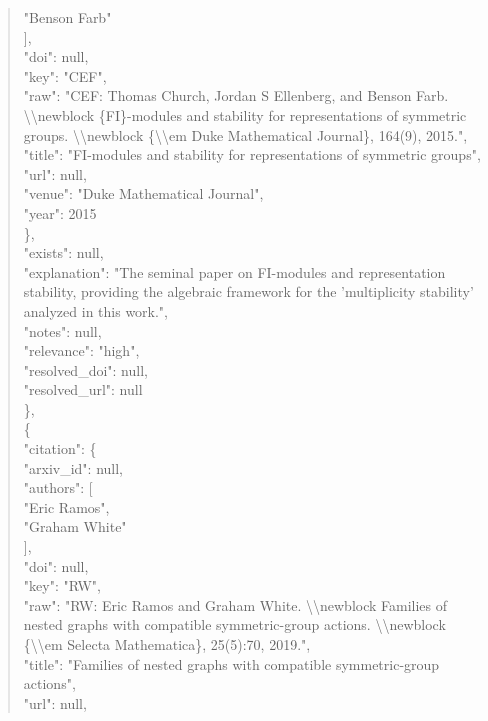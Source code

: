 \documentclass[11pt]{article}
\begin{document}
\begin{quote}
          "Benson Farb"\\
        ],\\
        "doi": null,\\
        "key": "CEF",\\
        "raw": "CEF: Thomas Church, Jordan S Ellenberg, and Benson Farb. \textbackslash{}\textbackslash{}newblock \{FI\}-modules and stability for representations of symmetric groups. \textbackslash{}\textbackslash{}newblock \{\textbackslash{}\textbackslash{}em Duke Mathematical Journal\}, 164(9), 2015.",\\
        "title": "FI-modules and stability for representations of symmetric groups",\\
        "url": null,\\
        "venue": "Duke Mathematical Journal",\\
        "year": 2015\\
      \},\\
      "exists": null,\\
      "explanation": "The seminal paper on FI-modules and representation stability, providing the algebraic framework for the 'multiplicity stability' analyzed in this work.",\\
      "notes": null,\\
      "relevance": "high",\\
      "resolved\_doi": null,\\
      "resolved\_url": null\\
    \},\\
    \{\\
      "citation": \{\\
        "arxiv\_id": null,\\
        "authors": [\\
          "Eric Ramos",\\
          "Graham White"\\
        ],\\
        "doi": null,\\
        "key": "RW",\\
        "raw": "RW: Eric Ramos and Graham White. \textbackslash{}\textbackslash{}newblock Families of nested graphs with compatible symmetric-group actions. \textbackslash{}\textbackslash{}newblock \{\textbackslash{}\textbackslash{}em Selecta Mathematica\}, 25(5):70, 2019.",\\
        "title": "Families of nested graphs with compatible symmetric-group actions",\\
        "url": null,\\

\end{quote}
\end{document}

